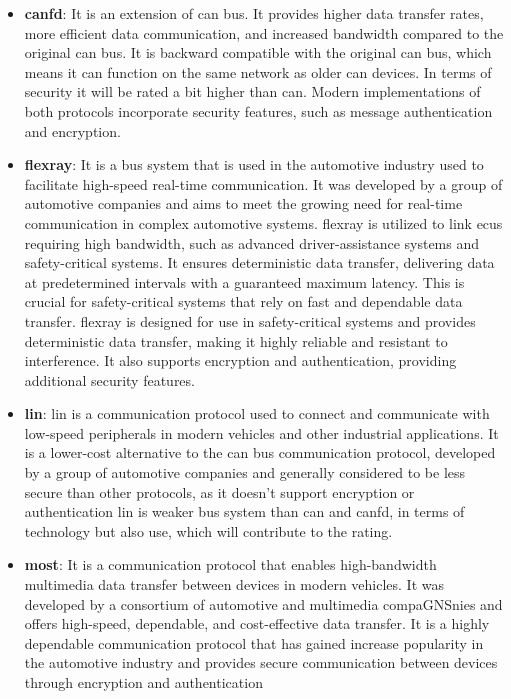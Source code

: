\begin{itemize}
    \item \textbf{\gls{canfd}}: It is an extension of \gls{can} bus.
    It provides higher data transfer rates, more efficient data communication, and increased bandwidth compared to the original \gls{can} bus.
    It is backward compatible with the original \gls{can} bus, which means it can function on the same network as older \gls{can} devices.
    In terms of security it will be rated a bit higher than \gls{can}.
    Modern implementations of both protocols incorporate security features, such as message authentication and encryption.
    
    \item \textbf{\gls{flexray}}: It is a bus system that is used in the automotive industry used to facilitate high-speed real-time communication.
    It was developed by a group of automotive companies and aims to meet the growing need for real-time communication in complex automotive systems.
    \gls{flexray} is utilized to link \gls{ecu}s requiring high bandwidth, such as advanced driver-assistance systems and safety-critical systems. 
    It ensures deterministic data transfer, delivering data at predetermined intervals with a guaranteed maximum latency. 
    This is crucial for safety-critical systems that rely on fast and dependable data transfer.
    \gls{flexray} is designed for use in safety-critical systems and provides deterministic data transfer, making it highly reliable and resistant to interference. 
    It also supports encryption and authentication, providing additional security features.

    \item \textbf{\gls{lin}}: \gls{lin} is a communication protocol used to connect and communicate with low-speed peripherals in modern vehicles and other industrial applications. 
    It is a lower-cost alternative to the \gls{can} bus communication protocol, developed by a group of automotive companies 
    and generally considered to be less secure than other protocols, as it doesn't support encryption or authentication
    \gls{lin} is weaker bus system than \gls{can} and \gls{canfd}, in terms of technology but also use, which will contribute to the rating.
    
    \item \textbf{\gls{most}}: It is a communication protocol that enables high-bandwidth multimedia data transfer between devices in modern vehicles. 
    It was developed by a consortium of automotive and multimedia compaGNSnies and offers high-speed, dependable, and cost-effective data transfer.
    It is a highly dependable communication protocol that has gained increase popularity in the automotive industry and
    provides secure communication between devices through encryption and authentication


\end{itemize}
